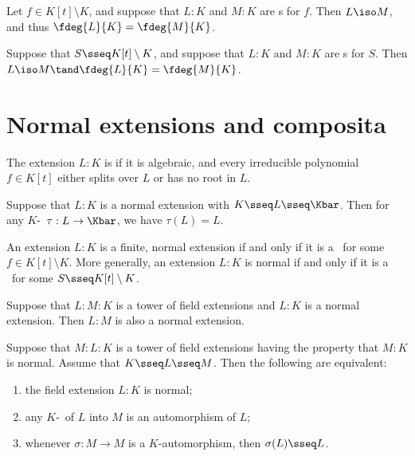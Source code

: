 \documentclass{article}
\begin{document}
  \begin{theorem}
    Let $ f\in K[t]\setminus K $, and suppose that $ L:K $ and $ M:K $ are \sfe s for $ f $.
    Then $ L\iso M $, and thus $ \fdeg{L}{K}=\fdeg{M}{K} $.
  \end{theorem}

  \begin{theorem}
    Suppose that $ S\sseq K[t]\setminus K $, and suppose that $ L:K $ and $ M:K $ are \sfe s for $ S $.
    Then $ L\iso M\tand \fdeg{L}{K}=\fdeg{M}{K} $.
  \end{theorem}

\section{Normal extensions and composita}
  \begin{definition}
    The extension $ L:K $ is  if it is algebraic, and every irreducible polynomial $ f\in K[t] $ either splits over $ L $ or has no root in $ L $.
  \end{definition}

  \begin{proposition}
    Suppose that $ L:K $ is a normal extension with $ K\sseq L\sseq \Kbar $.
    Then for any $ K $-\homo~$ \tau:L\to \Kbar $, we have $ \tau(L) = L $.
  \end{proposition}

  \begin{proposition}
    An extension $ L:K $ is a finite, normal extension if and only if it is a \sfe~for some $ f\in K[t]\setminus K $.
    More generally, an extension $ L:K $ is normal if and only if it is a \sfe~for some $ S\sseq K[t]\setminus K $.
  \end{proposition}

  \begin{proposition}
    Suppose that $ L:M:K $ is a tower of field extensions and $ L:K $ is a normal extension.
    Then $ L:M $ is also a normal extension.
  \end{proposition}

  \begin{theorem}
    Suppose that $ M:L:K $ is a tower of field extensions having the property that $ M:K $ is normal.
    Assume that $ K\sseq L\sseq M $.
    Then the following are equivalent: \begin{enumerate}[label=(\roman*)]
      \item the field extension $ L:K $ is normal;
      \item any $ K $-\homo~of $ L $ into $ M $ is an automorphism of $ L $;
      \item whenever $ \sigma:M\to M $ is a $ K $-automorphism, then $ \sigma(L)\sseq L $.
    \end{enumerate}
  \end{theorem}
\end{document}
